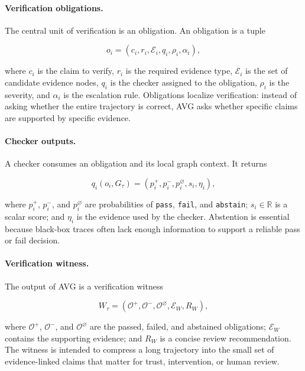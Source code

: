 \documentclass{article} %
\newcommand{\AVG}{\textsc{AVG}\xspace}
\begin{document}
\paragraph{Verification obligations.}
The central unit of verification is an obligation. An obligation is a tuple

\begin{equation}
o_i =
(c_i,r_i,\mathcal{E}_i,q_i,\rho_i,\alpha_i),
\end{equation}

where $c_i$ is the claim to verify, $r_i$ is the required evidence type, $\mathcal{E}_i$ is the set of candidate evidence nodes, $q_i$ is the checker assigned to the obligation, $\rho_i$ is the severity, and $\alpha_i$ is the escalation rule. Obligations localize verification: instead of asking whether the entire trajectory is correct, \AVG asks whether specific claims are supported by specific evidence.

\paragraph{Checker outputs.}
A checker consumes an obligation and its local graph context. It returns

\begin{equation}
q_i(o_i,G_\tau) = (p_i^{+},p_i^{-},p_i^{\varnothing},s_i,\eta_i),
\end{equation}

where $p_i^{+}$, $p_i^{-}$, and $p_i^{\varnothing}$ are probabilities of \texttt{pass}, \texttt{fail}, and \texttt{abstain}; $s_i \in \mathbb{R}$ is a scalar score; and $\eta_i$ is the evidence used by the checker. Abstention is essential because black-box traces often lack enough information to support a reliable pass or fail decision.

\paragraph{Verification witness.}
The output of \AVG is a verification witness

\begin{equation}
W_\tau =
(\mathcal{O}^{+},\mathcal{O}^{-},\mathcal{O}^{\varnothing},\mathcal{E}_W,R_W),
\end{equation}

where $\mathcal{O}^{+}$, $\mathcal{O}^{-}$, and $\mathcal{O}^{\varnothing}$ are the passed, failed, and abstained obligations; $\mathcal{E}_W$ contains the supporting evidence; and $R_W$ is a concise review recommendation. The witness is intended to compress a long trajectory into the small set of evidence-linked claims that matter for trust, intervention, or human review.
\end{document}
